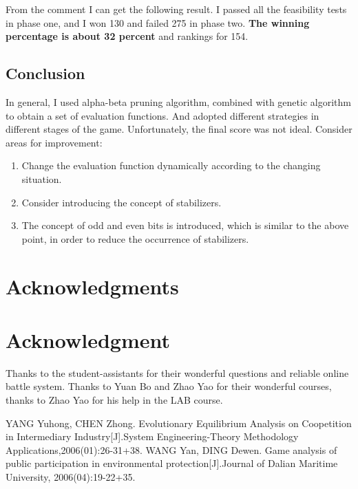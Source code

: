 \documentclass[conference,compsoc]{IEEEtran}
\begin{document}
From the comment I can get the following result. I passed all the feasibility tests in phase one, and I won 130 and failed 275 in phase two. \textbf{The winning percentage is about 32 percent} and rankings for 154. 

\subsection{Conclusion}
In general, I used alpha-beta pruning algorithm, combined with genetic algorithm to obtain a set of evaluation functions. And adopted different strategies in different stages of the game. Unfortunately, the final score was not ideal. Consider areas for improvement: 
\begin{enumerate}
\item Change the evaluation function dynamically according to the changing situation. 
\item Consider introducing the concept of stabilizers.
\item The concept of odd and even bits is introduced, which is similar to the above point, in order to reduce the occurrence of stabilizers.
\end{enumerate}

\ifCLASSOPTIONcompsoc
  \section*{Acknowledgments}
\else
  \section*{Acknowledgment}
\fi

Thanks to the student-assistants for their wonderful questions and reliable online battle system. Thanks to Yuan Bo and Zhao Yao for their wonderful courses, thanks to Zhao Yao for his help in the LAB course.




\begin{thebibliography}{1}
 YANG Yuhong, CHEN Zhong. Evolutionary Equilibrium Analysis on Coopetition in Intermediary Industry[J].System Engineering-Theory Methodology Applications,2006(01):26-31+38.
 WANG Yan, DING Dewen. Game analysis of public participation in environmental protection[J].Journal of Dalian Maritime University, 2006(04):19-22+35.
\end{thebibliography}





\end{document}
